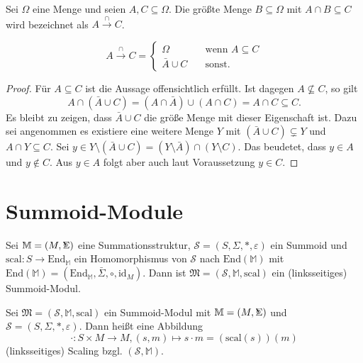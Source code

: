 \documentclass{article}
\DeclareMathOperator*{\Sigmacirc}{%
  \ThisStyle{\mathop{\ensurestackMath{\stackinset{c}{-0.75\LMpt}{c}{}{%
  \rotatebox[origin=lb]{-90}{$\circ$}}{\SavedStyle\Sigma}}}}}
\begin{document}
\begin{definition}
  Sei $\Omega$ eine Menge und seien $A, C \subseteq \Omega$. 
  Die größte Menge $B \subseteq \Omega$ mit $A \cap B \subseteq C$ wird bezeichnet als $A \overset{\cap}{\rightarrow} C$.
\end{definition}
\begin{theorem}
  \[   
  A \overset{\cap}{\rightarrow} C = 
    \begin{cases}
      \Omega &\quad\text{wenn } A \subseteq C \\
      \bar{A} \cup C &\quad\text{sonst.}
    \end{cases}
  \]
\end{theorem}
\begin{proof}
  Für $A \subseteq C$ ist die Aussage offensichtlich erfüllt.
  Ist dagegen $A \nsubseteq C$, so gilt
  \begin{equation*}
    A \cap (\bar{A} \cup C) = (A \cap \bar{A}) \cup (A \cap C) = A \cap C \subseteq C.
  \end{equation*}
  Es bleibt zu zeigen, dass $\bar{A} \cup C$ die größe Menge mit dieser Eigenschaft ist.
  Dazu sei angenommen es existiere eine weitere Menge $Y$ mit $(\bar{A} \cup C) \subsetneq Y$
  und $A \cap Y \subseteq C$.
  Sei $y \in Y \setminus (\bar{A} \cup C) = (Y \setminus \bar{A}) \cap (Y \setminus C)$.
  Das beudetet, dass $y \in A$ und $y \notin C$.
  Aus $y \in A$ folgt aber auch laut Voraussetzung $y \in C$.
\end{proof}

\newpage
\section{Summoid-Module}

\begin{definition}
  Sei $\mathbb{M} = (M, \Sigmacirc)$ eine Summationsstruktur, $\mathcal{S} = (S, \Sigma, \ast, \varepsilon)$ ein Summoid
  und $\text{scal} \colon S \to \text{End}_\mathbb{M}$ ein Homomorphismus von $\mathcal{S}$ nach $\text{End}(\mathbb{M})$
  mit $\text{End}(\mathbb{M}) = (\text{End}_\mathbb{M}, \bar\Sigma, \circ, \text{id}_M)$.
  Dann ist $\mathfrak{M} = (\mathcal{S}, \mathbb{M}, \text{scal})$ ein (linksseitiges) Summoid-Modul.
\end{definition}

\begin{definition}
  Sei $\mathfrak{M} = (\mathcal{S}, \mathbb{M}, \text{scal})$ ein Summoid-Modul mit
  $\mathbb{M} = (M, \Sigmacirc)$ und $\mathcal{S} = (S, \Sigma, \ast, \varepsilon)$.
  Dann heißt eine Abbildung 
  \begin{equation*}
    \cdot \colon S \times M \to M, (s, m) \mapsto s \cdot m = (\text{scal}(s))(m)
  \end{equation*}
  (linksseitiges) Scaling bzgl. $(\mathcal{S}, \mathbb{M})$.
\end{definition}
\end{document}
